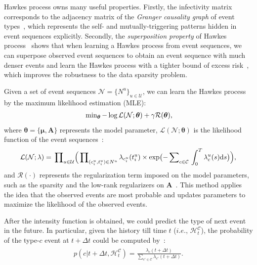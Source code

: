 \documentclass[runningheads]{llncs}
\newcommand{\dd}{\mathrm{d}}
\begin{document}
Hawkes process owns many useful properties. 
Firstly, the infectivity matrix corresponds to the adjacency matrix of the \textit{Granger causality graph} of event types~\cite{xu2016learning}, which represents the self- and mutually-triggering patterns hidden in event sequences explicitly. 
Secondly, the \textit{superposition property} of Hawkes process~\cite{xu2018benefits} shows that when learning a Hawkes process from event sequences, we can superpose observed event sequences to obtain an event sequence with much denser events and learn the Hawkes process with a tighter bound of excess risk~\cite{xu2018benefits}, which improves the robustness to the data sparsity problem.

Given a set of event sequences $\mathcal{N}=\{N^u\}_{u\in\mathcal{U}}$, we can learn the Hawkes process by the maximum likelihood estimation (MLE):
\begin{eqnarray}\label{eq:mle}
\begin{aligned}
\sideset{}{_{\bm{\theta}}}\min -\log \mathcal{L}(\mathcal{N};\bm{\theta}) + \gamma \mathcal{R}(\bm{\theta}), 
\end{aligned}    
\end{eqnarray}
where $\bm{\theta}=\{\bm{\mu},\bm{A}\}$ represents the model parameter, $\mathcal{L}(\mathcal{N};\bm{\theta})$ is the likelihood function of the event sequences~\cite{daley2008introduction}:
\begin{eqnarray}\label{eq:likelihood}
\begin{aligned}
\mathcal{L}(\mathcal{N};\lambda) = \sideset{}{_{u\in\mathcal{U}}}\prod \Bigl(\sideset{}{_{(c_i^u, t_i^u) \in N^u}}\prod \lambda_{c_i^u}(t_i^u) \times \exp \bigl( - \sideset{}{_{c\in\mathcal{C}}}\sum\sideset{}{_{0}^T}\int \lambda_c^u(s) \dd s \bigr)\Bigr),
\end{aligned}    
\end{eqnarray}
and $\mathcal{R}(\cdot)$ represents the regularization term imposed on the model parameters, such as the sparsity and the low-rank regularizers on $\bm{A}$~\cite{zhou2013learning}.
This method applies the idea that the observed events are most probable and updates parameters to maximize the likelihood of the observed events. 

After the intensity function is obtained, we could predict the type of next event in the future. 
In particular, given the history till time $t$ ($i.e.$, $\mathcal{H}_t^{\mathcal{C}}$), the probability of the type-$c$ event at $t + \Delta t$ could be computed by~\cite{xu2016patient}:
\begin{eqnarray}\label{eq:prediction}
\begin{aligned}
p(c | t+\Delta t, \mathcal{H}_t^{\mathcal{C}}) = \frac{\lambda_c(t+\Delta t)}{\sum_{c'\in\mathcal{C}}\lambda_{c'} (t+\Delta t)}.
\end{aligned}    
\end{eqnarray}
\end{document}
